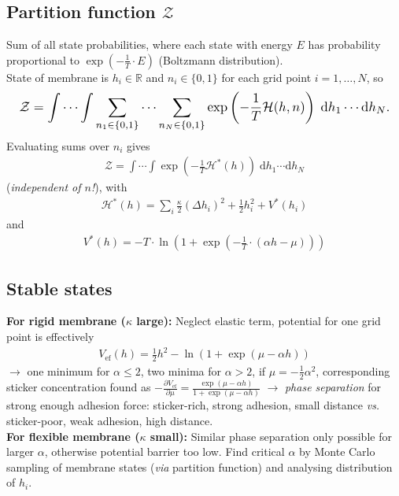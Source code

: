 \documentclass[twocolumn]{scrartcl}
\begin{document}
\subsection*{Partition function $ \mathcal{Z} $}
Sum of all state probabilities, where each state with energy $E$ has probability proportional to $\exp(-\frac{1}{T} \cdot E)$ (Boltzmann distribution). \\
State of membrane is $h_i \in \mathbb{R}$ and $n_i \in \{0,1\}$ for each grid point $i = 1,\ldots,N$, so
\begin{equation*}
\resizebox{\hsize}{!}{
    $\displaystyle
    \mathcal{Z} = \int \cdots \int \sum_{n_1 \in \{0,1\}} \cdots \sum_{n_N \in \{0,1\}} \exp \left(-\frac{1}{T} \mathcal{H}(h,n) \right) \; \mathrm{d}h_1 \cdots \mathrm{d}h_N.
    $
}
\end{equation*}
Evaluating sums over $n_i$ gives
\begin{align*}
    \mathcal{Z} = \int \cdots \int \exp \left( -\frac{1}{T} \mathcal{H}^\ast(h) \right) \; \mathrm{d}h_1 \cdots \mathrm{d}h_N
\end{align*}
(\emph{independent of $n$!}), with
\begin{align*}
    \mathcal{H}^\ast(h) = \sum_i \frac{\kappa}{2}(\Delta h_i)^2 + \frac12 h_i^2 + V^\ast(h_i)
\end{align*}
and
\begin{align*}
    V^\ast(h) = -T \cdot \ln \left( 1 + \exp \left( -\frac{1}{T} \cdot (\alpha h - \mu) \right) \right)
\end{align*}

\subsection*{Stable states}
\textbf{For rigid membrane ($\kappa$ large):}
Neglect elastic term, potential for one grid point is effectively
\begin{align*}
    V_\text{ef}(h) = \frac12 h^2 - \ln(1 + \exp(\mu - \alpha h))
\end{align*}
$\longrightarrow$ one minimum for $\alpha \leq 2$, two minima for $\alpha > 2$, if $\mu = -\frac12 \alpha^2$,
corresponding sticker concentration found as $-\frac{\partial V_\text{ef}}{\partial \mu} = \frac{\exp(\mu - \alpha h)}{1 + \exp(\mu - \alpha h)}$
$\longrightarrow$ \emph{phase separation} for strong enough adhesion force: sticker-rich, strong adhesion, small distance \emph{vs.} sticker-poor, weak adhesion, high distance. \\
\textbf{For flexible membrane ($\kappa$ small):}
Similar phase separation only possible for larger $\alpha$, otherwise potential barrier too low.
Find critical $\alpha$ by Monte Carlo sampling of membrane states (\textit{via} partition function) and analysing distribution of $h_i$.
\end{document}
